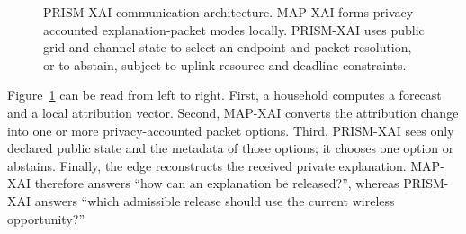 \documentclass[conference]{IEEEtran}
\begin{document}
\begin{figure}[t]
{%
}
\caption{PRISM-XAI communication architecture. MAP-XAI forms
privacy-accounted explanation-packet modes locally. PRISM-XAI uses public
grid and channel state to select an endpoint and packet resolution, or to
abstain, subject to uplink resource and deadline constraints.}
\label{fig:architecture}
\end{figure}

Figure~\ref{fig:architecture} can be read from left to right. First, a household
computes a forecast and a local attribution vector. Second, MAP-XAI converts
the attribution change into one or more privacy-accounted packet options.
Third, PRISM-XAI sees only declared public state and the metadata of those
options; it chooses one option or abstains. Finally, the edge reconstructs the
received private explanation. MAP-XAI therefore answers ``how can an
explanation be released?'', whereas PRISM-XAI answers ``which admissible
release should use the current wireless opportunity?''
\end{document}
